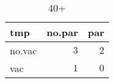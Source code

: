 %
\begin{table}[!tbp]
\caption{40+\label{40+}} 
\begin{center}
\begin{tabular}{lrr}
\hline\hline
\multicolumn{1}{l}{tmp}&\multicolumn{1}{c}{no.par}&\multicolumn{1}{c}{par}\tabularnewline
\hline
no.vac&$3$&$2$\tabularnewline
vac&$1$&$0$\tabularnewline
\hline
\end{tabular}
\end{center}
\end{table}

